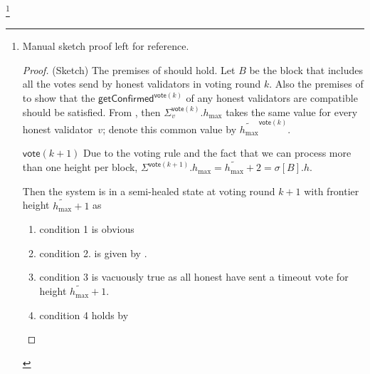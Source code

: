 \ifx\litemode\undefined\documentclass{article}\fi
\newcommand{\hmax}{\ensuremath{h_{\max}}\xspace}
\newcommand{\vote}{\ensuremath{\mathsf{vote}}}
\newcommand{\comm}[1]{\ensuremath{\widetilde{#1}}}
\newcommand{\getConfirmed}{\textsf{getConfirmed}\xspace}
\theoremstyle{plain}
\theoremstyle{definition}
\theoremstyle{remark}
\begin{document}
\iffull
\footnote{
Manual sketch proof left for reference.
\begin{proof}(Sketch)
  The premises of   should hold.
  Let $B$ be the block that includes all the votes send by honest validators in voting round $k$.
  Also the premises of  to show that the $\getConfirmed^{\vote(k)}$ of any honest validators are compatible should be satisfied.
  From , then $\Sigma_v^{\vote(k)}.\hmax$ takes the same value for every honest validator~$v$; denote this common value by $\comm{\hmax}^{\vote(k)}$.

  $\vote(k+1)$
  Due to the voting rule and the fact that we can process more than one height per block, $\Sigma^{\vote(k+1)}.\hmax = \comm{\hmax}+2 = \sigma[B].h$.




  Then the system is in a semi-healed state at voting round $k+1$ with frontier height $\comm{\hmax}+1$ as
  \begin{enumerate}
    \item condition 1 is obvious
    \item condition 2. is given by .
    \item condition 3 is vacuously  true as all honest have sent a timeout vote for height $\comm{\hmax}+1$.
    \item condition 4 holds by 
  \end{enumerate}
\end{proof}}
\fi
\end{document}
